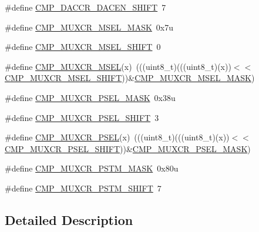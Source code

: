 \begin{DoxyCompactItemize}
\#define \hyperlink{group___c_m_p___register___masks_ga85aa1686a0d5a7de2375bfab7167bb93}{C\+M\+P\+\_\+\+D\+A\+C\+C\+R\+\_\+\+D\+A\+C\+E\+N\+\_\+\+S\+H\+I\+FT}~7
\item 
\#define \hyperlink{group___c_m_p___register___masks_ga6ff83366097d3be5ae93234b68684cf5}{C\+M\+P\+\_\+\+M\+U\+X\+C\+R\+\_\+\+M\+S\+E\+L\+\_\+\+M\+A\+SK}~0x7u
\item 
\#define \hyperlink{group___c_m_p___register___masks_gad74d8206afe9b7ad009b0a7ac2bbf1cf}{C\+M\+P\+\_\+\+M\+U\+X\+C\+R\+\_\+\+M\+S\+E\+L\+\_\+\+S\+H\+I\+FT}~0
\item 
\#define \hyperlink{group___c_m_p___register___masks_ga31028e9db6d77502d4561380ce1b12fe}{C\+M\+P\+\_\+\+M\+U\+X\+C\+R\+\_\+\+M\+S\+EL}(x)~(((uint8\+\_\+t)(((uint8\+\_\+t)(x))$<$$<$\hyperlink{group___c_m_p___register___masks_gad74d8206afe9b7ad009b0a7ac2bbf1cf}{C\+M\+P\+\_\+\+M\+U\+X\+C\+R\+\_\+\+M\+S\+E\+L\+\_\+\+S\+H\+I\+FT}))\&\hyperlink{group___c_m_p___register___masks_ga6ff83366097d3be5ae93234b68684cf5}{C\+M\+P\+\_\+\+M\+U\+X\+C\+R\+\_\+\+M\+S\+E\+L\+\_\+\+M\+A\+SK})
\item 
\#define \hyperlink{group___c_m_p___register___masks_gaba9739da107b2a2b908af338d14df160}{C\+M\+P\+\_\+\+M\+U\+X\+C\+R\+\_\+\+P\+S\+E\+L\+\_\+\+M\+A\+SK}~0x38u
\item 
\#define \hyperlink{group___c_m_p___register___masks_gab686629f56ced4b88c699f0f610dece5}{C\+M\+P\+\_\+\+M\+U\+X\+C\+R\+\_\+\+P\+S\+E\+L\+\_\+\+S\+H\+I\+FT}~3
\item 
\#define \hyperlink{group___c_m_p___register___masks_ga23ea598b890c708e1748b52475f92f50}{C\+M\+P\+\_\+\+M\+U\+X\+C\+R\+\_\+\+P\+S\+EL}(x)~(((uint8\+\_\+t)(((uint8\+\_\+t)(x))$<$$<$\hyperlink{group___c_m_p___register___masks_gab686629f56ced4b88c699f0f610dece5}{C\+M\+P\+\_\+\+M\+U\+X\+C\+R\+\_\+\+P\+S\+E\+L\+\_\+\+S\+H\+I\+FT}))\&\hyperlink{group___c_m_p___register___masks_gaba9739da107b2a2b908af338d14df160}{C\+M\+P\+\_\+\+M\+U\+X\+C\+R\+\_\+\+P\+S\+E\+L\+\_\+\+M\+A\+SK})
\item 
\#define \hyperlink{group___c_m_p___register___masks_ga5636686e652e5c89b119ff1954c0e98a}{C\+M\+P\+\_\+\+M\+U\+X\+C\+R\+\_\+\+P\+S\+T\+M\+\_\+\+M\+A\+SK}~0x80u
\item 
\#define \hyperlink{group___c_m_p___register___masks_gafd77773e4a14b8f22b0b00c52a180d0c}{C\+M\+P\+\_\+\+M\+U\+X\+C\+R\+\_\+\+P\+S\+T\+M\+\_\+\+S\+H\+I\+FT}~7
\end{DoxyCompactItemize}


\subsection{Detailed Description}


